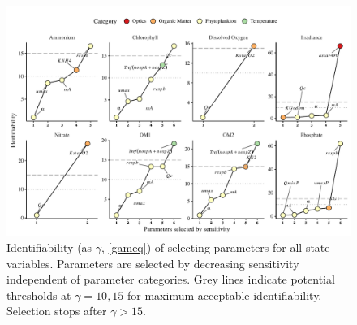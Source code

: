 \documentclass[letterpaper,12pt,oneside]{article}\usepackage[]{graphicx}\usepackage[]{color}
\newcommand{\beginsupplement}{%
        \setcounter{table}{0}
        \renewcommand{\thetable}{S\arabic{table}}%
        \setcounter{figure}{0}
        \renewcommand{\thefigure}{S\arabic{figure}}%
     }
\begin{document}
\begin{figure}[!ht]

{\centering \includegraphics[width=\textwidth]{figs/heurist_stts-1} 

}

\caption[Identifiability (as ]{Identifiability (as $\gamma$, \cref{gameq}) of selecting parameters for all state variables. Parameters are selected by decreasing sensitivity independent of parameter categories. Grey lines indicate potential thresholds at $\gamma = 10, 15$ for maximum acceptable identifiability. Selection stops after $\gamma > 15$.}\label{fig:heurist_stts}
\end{figure}


\clearpage

\beginsupplement
\end{document}
